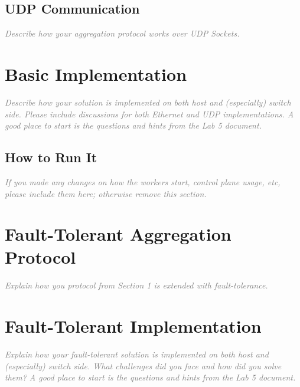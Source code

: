 \documentclass[a4paper,11pt]{article}
\newcommand{\note}[1]{\textit{\textcolor{gray}{#1}}}
\begin{document}
\subsection{UDP Communication}

\note{Describe how your aggregation protocol works over UDP Sockets.}

\section{Basic Implementation}

\note{Describe how your solution is implemented on both host and (especially) switch side. Please include discussions for both Ethernet and UDP implementations. A good place to start is the questions and hints from the Lab 5 document.}

\subsection{How to Run It}

\note{If you made any changes on how the workers start, control plane usage, etc, please include them here; otherwise remove this section.}
 
\section{Fault-Tolerant Aggregation Protocol}

\note{Explain how you protocol from Section 1 is extended with fault-tolerance.}

\section{Fault-Tolerant Implementation}

\note{Explain how your fault-tolerant solution is implemented on both host and (especially) switch side. What challenges did you face and how did you solve them? A good place to start is the questions and hints from the Lab 5 document.}
\end{document}
